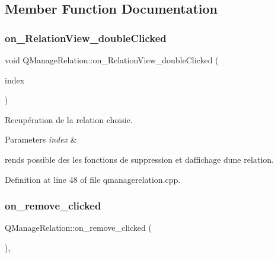 \subsection{Member Function Documentation}
\mbox{\label{class_q_manage_relation_a45a9416aa18e0d6729ef5d0f9c37e626}} 
\subsubsection{\texorpdfstring{on\+\_\+\+Relation\+View\+\_\+double\+Clicked}{on\_RelationView\_doubleClicked}}
{\footnotesize\ttfamily void Q\+Manage\+Relation\+::on\+\_\+\+Relation\+View\+\_\+double\+Clicked (\begin{DoxyParamCaption}\item[{Q\+Model\+Index}]{index }\end{DoxyParamCaption})\hspace{0.3cm}{\ttfamily [slot]}}



Recupération de la relation choisie. 


\begin{DoxyParams}{Parameters}
{\em index} & \\
\hline
\end{DoxyParams}
rends possible des les fonctions de suppression et d\textquotesingle{}affichage d\textquotesingle{}une relation. 

Definition at line 48 of file qmanagerelation.\+cpp.

\mbox{\label{class_q_manage_relation_a0ad8c5f51b68248b2d42e980d99e4820}} 
\subsubsection{\texorpdfstring{on\+\_\+remove\+\_\+clicked}{on\_remove\_clicked}}
{\footnotesize\ttfamily Q\+Manage\+Relation\+::on\+\_\+remove\+\_\+clicked (\begin{DoxyParamCaption}{ }\end{DoxyParamCaption})\hspace{0.3cm}{\ttfamily [inline]}, {\ttfamily [slot]}}



